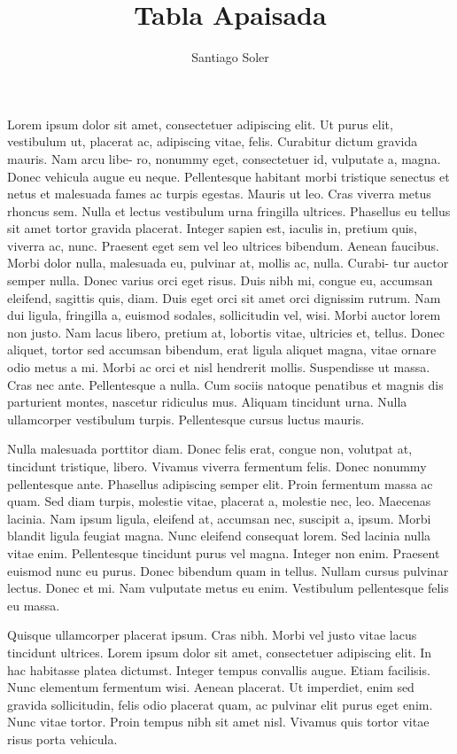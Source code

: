 \documentclass[11pt,a4paper]{article}
\title{Tabla Apaisada}
\author{Santiago Soler}
\date{}
\begin{document}
\renewcommand{\tablename}{Tabla}

\maketitle

Lorem ipsum dolor sit amet, consectetuer adipiscing elit. Ut purus elit, vestibulum
ut, placerat ac, adipiscing vitae, felis. Curabitur dictum gravida mauris. Nam arcu libe-
ro, nonummy eget, consectetuer id, vulputate a, magna. Donec vehicula augue eu neque.
Pellentesque habitant morbi tristique senectus et netus et malesuada fames ac turpis
egestas. Mauris ut leo. Cras viverra metus rhoncus sem. Nulla et lectus vestibulum urna
fringilla ultrices. Phasellus eu tellus sit amet tortor gravida placerat. Integer sapien est,
iaculis in, pretium quis, viverra ac, nunc. Praesent eget sem vel leo ultrices bibendum.
Aenean faucibus. Morbi dolor nulla, malesuada eu, pulvinar at, mollis ac, nulla. Curabi-
tur auctor semper nulla. Donec varius orci eget risus. Duis nibh mi, congue eu, accumsan
eleifend, sagittis quis, diam. Duis eget orci sit amet orci dignissim rutrum.
Nam dui ligula, fringilla a, euismod sodales, sollicitudin vel, wisi. Morbi auctor lorem
non justo. Nam lacus libero, pretium at, lobortis vitae, ultricies et, tellus. Donec aliquet,
tortor sed accumsan bibendum, erat ligula aliquet magna, vitae ornare odio metus a mi.
Morbi ac orci et nisl hendrerit mollis. Suspendisse ut massa. Cras nec ante. Pellentesque a
nulla. Cum sociis natoque penatibus et magnis dis parturient montes, nascetur ridiculus
mus. Aliquam tincidunt urna. Nulla ullamcorper vestibulum turpis. Pellentesque cursus
luctus mauris.

Nulla malesuada porttitor diam. Donec felis erat, congue non, volutpat at, tincidunt
tristique, libero. Vivamus viverra fermentum felis. Donec nonummy pellentesque ante.
Phasellus adipiscing semper elit. Proin fermentum massa ac quam. Sed diam turpis,
molestie vitae, placerat a, molestie nec, leo. Maecenas lacinia. Nam ipsum ligula, eleifend
at, accumsan nec, suscipit a, ipsum. Morbi blandit ligula feugiat magna. Nunc eleifend
consequat lorem. Sed lacinia nulla vitae enim. Pellentesque tincidunt purus vel magna.
Integer non enim. Praesent euismod nunc eu purus. Donec bibendum quam in tellus.
Nullam cursus pulvinar lectus. Donec et mi. Nam vulputate metus eu enim. Vestibulum
pellentesque felis eu massa.

Quisque ullamcorper placerat ipsum. Cras nibh. Morbi vel justo vitae lacus tincidunt
ultrices. Lorem ipsum dolor sit amet, consectetuer adipiscing elit. In hac habitasse platea
dictumst. Integer tempus convallis augue. Etiam facilisis. Nunc elementum fermentum
wisi. Aenean placerat. Ut imperdiet, enim sed gravida sollicitudin, felis odio placerat
quam, ac pulvinar elit purus eget enim. Nunc vitae tortor. Proin tempus nibh sit amet
nisl. Vivamus quis tortor vitae risus porta vehicula.
\end{document}
